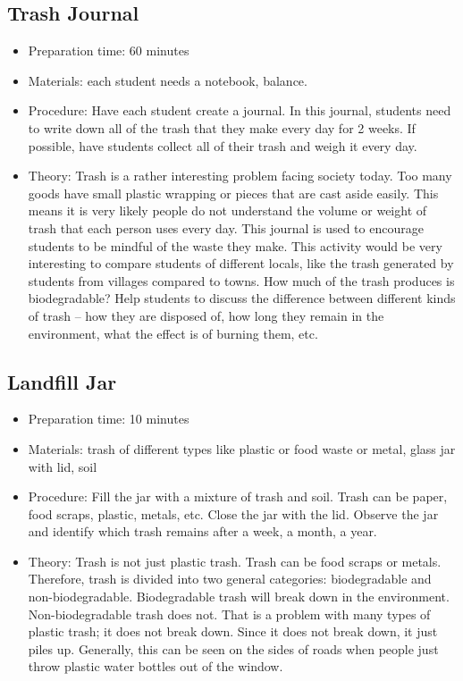 \subsection{Trash Journal}
\begin{itemize}
\item{Preparation time: 60 minutes}
\item{Materials: each student needs a notebook, balance.}
\item{Procedure: Have each student create a journal. In this journal, students need to write down all of the trash that they make every day for 2 weeks. If possible, have students collect all of their trash and weigh it every day.}
\item{Theory: Trash is a rather interesting problem facing society today. Too many goods have small plastic wrapping or pieces that are cast aside easily. This means it is very likely people do not understand the volume or weight of trash that each person uses every day. This journal is used to encourage students to be mindful of the waste they make. This activity would be very interesting to compare students of different locals, like the trash generated by students from villages compared to towns. How much of the trash produces is biodegradable? Help students to discuss the difference between different kinds of trash -- how they are disposed of, how long they remain in the environment, what the effect is of burning them, etc.}
\end{itemize}

\subsection{Landfill Jar}
\begin{itemize}
\item{Preparation time: 10 minutes}
\item{Materials: trash of different types like plastic or food waste or metal, glass jar with lid, soil}
\item{Procedure: Fill the jar with a mixture of trash and soil. Trash can be paper, food scraps, plastic, metals, etc. Close the jar with the lid. Observe the jar and identify which trash remains after a week, a month, a year.}
\item{Theory: Trash is not just plastic trash. Trash can be food scraps or metals. Therefore, trash is divided into two general categories: biodegradable and non-biodegradable. Biodegradable trash will break down in the environment. Non-biodegradable trash does not. That is a problem with many types of plastic trash; it does not break down. Since it does not break down, it just piles up. Generally, this can be seen on the sides of roads when people just throw plastic water bottles out of the window.}
\end{itemize}

